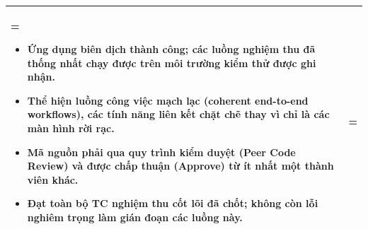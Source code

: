 \begin{table}[H]
\begin{tabularx}{\textwidth}{|>{\hsize=0.5\hsize\linewidth=\hsize\bfseries}X|>{\hsize=1.5\hsize\linewidth=\hsize}X|}
\begin{itemize}[leftmargin=*, nosep]
            \item Ứng dụng biên dịch thành công; các luồng nghiệm thu đã thống nhất chạy được trên môi trường kiểm thử được ghi nhận.
            \item Thể hiện luồng công việc mạch lạc (coherent end-to-end workflows), các tính năng liên kết chặt chẽ thay vì chỉ là các màn hình rời rạc.
            \item Mã nguồn phải qua quy trình kiểm duyệt (Peer Code Review) và được chấp thuận (Approve) từ ít nhất một thành viên khác.
            \item Đạt toàn bộ TC nghiệm thu cốt lõi đã chốt; không còn lỗi nghiêm trọng làm gián đoạn các luồng này.
        \end{itemize}
        \vspace{-1em} \\
        \hline
    \end{tabularx}
\end{table}

